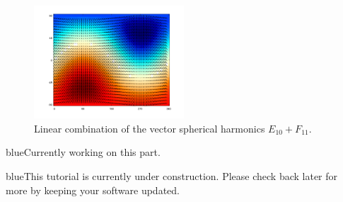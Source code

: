 \documentclass[11pt]{article}
\newcommand{\TAG}{\begin{color}{blue}This tutorial is currently under construction. Please check back later for more by keeping your software updated.\end{color}}
\newcommand{\HERE}{\begin{color}{blue}Currently working on this part.\end{color}}
\begin{document}
\begin{figure}[H]
  \centering
  \includegraphics[width=0.5\textwidth]{figures_Rep2/lincombEF_quiver.png}  
  \caption{Linear combination of the vector spherical harmonics $E_{10}+F_{11}$.}
\label{EFcomb_quiver}
\end{figure}



\HERE

\TAG
\end{document}
